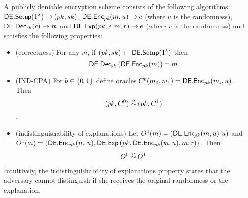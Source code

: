 \begin{mydef}
A publicly deniable encryption scheme consists of the following algorithms $\mathsf{DE.Setup}(1^\lambda)\to(pk,sk)$, $\mathsf{DE.Enc}_{pk}(m,u)\to c$ (where $u$ is the randomness), $\mathsf{DE.Dec}_{sk}(c)\to m$ and $\mathsf{DE.Exp}(pk,c,m,r)\to e$ (where $r$ is the randomness) and satisfies the following properties:
\begin{itemize}
\item (correctness) For any $m$, if $(pk,sk)\gets \mathsf{DE.Setup}(1^\lambda)$ then
\[
\mathsf{DE.Dec}_{sk}\left(\mathsf{DE.Enc}_{pk}(m)\right)=m
\]
\item (IND-CPA) For $b\in\{0,1\}$ define oracles $C^b(m_0,m_1)=\mathsf{DE.Enc}_{pk}(m_b,u)$. Then $$(pk,C^0)\overset{o}{\sim}(pk,C^1)$$.
\item (indistinguishability of explanations) Let $O^0(m)=\left(\mathsf{DE.Enc}_{pk}(m,u),u\right)$ and $O^1(m)=\left(\mathsf{DE.Enc}_{pk}(m,u),\mathsf{DE.Exp}\left(pk,\mathsf{DE.Enc}_{pk}(m,u),m,r\right)\right)$. Then
\[
O^0\overset{o}{\sim} O^1
\]
\end{itemize}
\end{mydef}
Intuitively, the indistinguishability of explanations property states that the adversary cannot distinguish if she receives the original randomness or the explanation.
